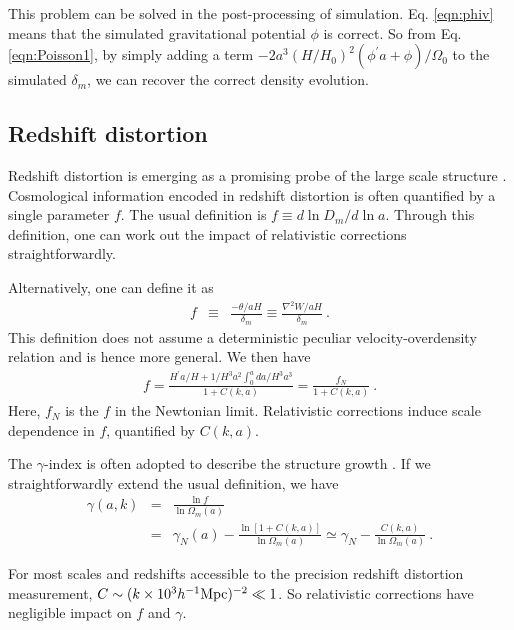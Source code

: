 \documentclass[aps,prl,showpacs,nobibnotes,twocolumn,
nobalancelastpage,superscriptaddress]{revtex4}
\newcommand{\ba}{\begin{eqnarray}}
\newcommand{\ea}{\end{eqnarray}}
\newcommand{\mpch}{h^{-1} {\rm Mpc}}
\begin{document}
This problem can be solved in the
post-processing of simulation. Eq. \ref{eqn:phiv} means that the simulated
gravitational potential $\phi$ is correct. So from Eq. \ref{eqn:Poisson1}, by simply
adding  a term $-2a^3(H/H_0)^2(\phi^{'}a+\phi)/\Omega_0$ to the simulated
$\delta_m$, we can recover the correct density evolution. 

\subsection{Redshift distortion} 
Redshift distortion is emerging as a promising probe of the large scale
structure \cite{RD}. Cosmological information encoded in redshift distortion is often
quantified by a single parameter $f$.  The usual definition is $f\equiv d\ln
D_m/d\ln a$.  Through this definition, one can work out the impact of
relativistic corrections straightforwardly.

Alternatively, one can define it as 
\ba
f&\equiv & \frac{-\theta/aH}{\delta_m}\equiv \frac{\nabla^2W/aH}{\delta_m}\ .
\ea
This definition does not assume a deterministic peculiar velocity-overdensity
relation and is hence more general. We then have
\ba 
f=\frac{H^{'}a/H+1/H^3a^2\int_0^a
    da/H^3a^3}{1+C(k,a)}=\frac{f_N}{1+C(k,a)} \nonumber\ .
\ea
Here, $f_N$ is the $f$ in the Newtonian limit. Relativistic corrections
induce scale dependence in $f$, quantified by $C(k,a)$.

The $\gamma$-index is often adopted to describe the structure growth \cite{gammaindex}.  If we
straightforwardly extend the usual definition, we have
\ba
\gamma(a,k)&=&\frac{\ln f}{\ln \Omega_m(a)} \\ 
&=&\gamma_N(a)-\frac{\ln [1+C(k,a)]}{\ln
  \Omega_m(a)}\simeq \gamma_N-\frac{C(k,a)}{\ln
  \Omega_m(a)}\nonumber\ .
\ea

For  most scales and redshifts accessible to the precision redshift distortion
measurement,  $C\sim (k\times 10^3\mpch)^{-2}\ll 1$.  So relativistic
corrections have negligible impact on $f$ and $\gamma$. 
\end{document}
